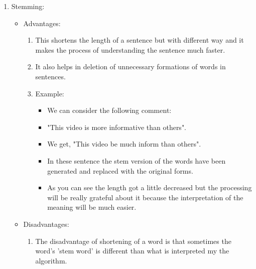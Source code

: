 \documentclass{article}
\begin{document}
{\begin{enumerate}
\begin{enumerate}
\begin{itemize}
\begin{enumerate}
\begin{itemize}
                    \item We get "video disappointed"
                    \item The comment will be classified as 'negative' even it is 'positive' in nature.
                    \item The removal of stop words removed some significant words which were important for the true meaning of the sentence.
                    \item The List of Stop words used here contained some important words like [did, not] and they were removed.
                \end{itemize}
            \end{enumerate}
        \end{itemize}
        \item Stemming:
        \begin{itemize}
            \item Advantages:
            \begin{enumerate}
                \item This shortens the length of a sentence but with different way and it makes the process of understanding the sentence much faster.
                \item It also helps in deletion of unnecessary formations of words in sentences.
                \item Example:
                \begin{itemize}
                    \item We can consider the following comment:
                    \item "This video is more informative than others".
                    \item We get, "This video be much inform than others".
                    \item In these sentence the stem version of the words have been generated and replaced with the original forms.
                    \item As you can see the length got a little decreased but the processing will be really grateful about it because the interpretation of the meaning will be much easier.
                \end{itemize}
            \end{enumerate}
            \item Disadvantages:
            \begin{enumerate}
                \item The disadvantage of shortening of a word is that sometimes the word's 'stem word' is different than what is interpreted my the algorithm.

\end{enumerate}
\end{itemize}
\end{enumerate}
\end{enumerate}}
\end{document}
